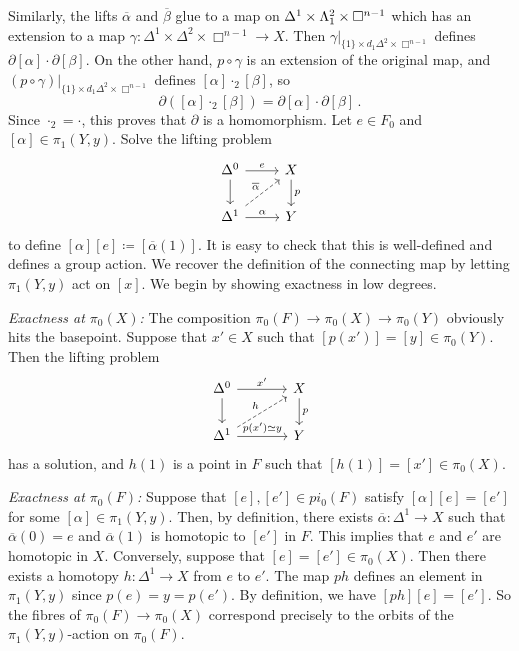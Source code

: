         Similarly, the lifts $\overline{\alpha}$ and $\overline{\beta}$ glue to a map on $\Delta^1 \times \Lambda^{2}_{1} \times \Box^{n-1}$ which has an extension to a map $\gamma \colon \Delta^1 \times \Delta^2 \times \Box^{n-1} \to X$. Then ${\gamma|}_{\{1\} \times d_1 \Delta^2 \times \Box^{n-1}}$ defines $\partial[\alpha] \cdot \partial[\beta]$. On the other hand, $p \circ \gamma$ is an extension of the original map, and ${(p \circ \gamma)|}_{\{1\} \times d_1 \Delta^2 \times \Box^{n-1}}$ defines $[\alpha] \cdot_2 [\beta]$, so
        \begin{equation*}
            \partial ([\alpha] \cdot_2 [\beta]) = \partial [\alpha] \cdot \partial [\beta] \,.
        \end{equation*}
        Since $\cdot_2 = \cdot$, this proves that $\partial$ is a homomorphism.
        Let $e \in F_0$ and $[\alpha] \in \pi_1(Y, y)$. Solve the lifting problem
        \begin{equation*}
            \begin{tikzcd}
                \Delta^0 \arrow[d] \arrow[r, "e"] & X \arrow[d, "p"] \\
                \Delta^1 \arrow[ur, dashed, "\overline{\alpha}"] \arrow[r, "\alpha"] & Y
            \end{tikzcd}
        \end{equation*}
        to define $[\alpha][e] \coloneq [\overline{\alpha}(1)]$. It is easy to check that this is well-defined and defines a group action. We recover the definition of the connecting map by letting $\pi_1(Y, y)$ act on $[x]$.
        We begin by showing exactness in low degrees.
        
        \emph{Exactness at $\pi_0(X)$:} The composition $\pi_0(F) \to \pi_0(X) \to \pi_0(Y)$ obviously hits the basepoint. Suppose that $x' \in X$ such that $[p(x')] = [y] \in \pi_0(Y)$. Then the lifting problem
        \begin{equation*}
            \begin{tikzcd}[column sep=large]
                \Delta^0 \arrow[d] \arrow[r, "x'"] & X \arrow[d, "p"] \\
                \Delta^1 \arrow[ur, dashed, "h"] \arrow[r, "p{(x')} \simeq y"] & Y
            \end{tikzcd}
        \end{equation*}
        has a solution, and $h(1)$ is a point in $F$ such that $[h(1)] = [x'] \in \pi_0(X)$.
        
        \emph{Exactness at $\pi_0(F)$:} Suppose that $[e], [e'] \in pi_0(F)$ satisfy $[\alpha][e] = [e']$ for some $[\alpha] \in \pi_1(Y, y)$. Then, by definition, there exists $\overline{\alpha} \colon \Delta^1 \to X$ such that $\overline{\alpha}(0) = e$ and $\overline{\alpha}(1)$ is homotopic to $[e']$ in $F$. This implies that $e$ and $e'$ are homotopic in $X$.
        Conversely, suppose that $[e] = [e'] \in \pi_0(X)$. Then there exists a homotopy $h \colon \Delta^1 \to X$ from $e$ to $e'$. The map $ph$ defines an element in $\pi_1(Y, y)$ since $p(e) = y = p(e')$. By definition, we have $[ph][e] = [e']$. So the fibres of $\pi_0(F) \to \pi_0(X)$ correspond precisely to the orbits of the $\pi_1(Y, y)$-action on $\pi_0(F)$.
        
